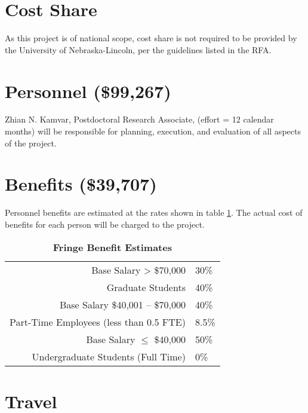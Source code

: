 \documentclass[12pt,letterpaper]{article}
\title{\ruleline{Budget Justification}}
\begin{document}
\maketitle

\section{Cost Share}

As this project is of national scope, cost share is not required to be provided by the University of Nebraska-Lincoln, per the guidelines listed in the RFA.

\section{Personnel (\$99,267)}
Zhian N. Kamvar, Postdoctoral Research Associate, (effort = 12 calendar months) will be responsible for planning, execution, and evaluation of all aspects of the project.

\section{Benefits (\$39,707)}

Personnel benefits are estimated at the rates shown in table \ref{fbe}. 
The actual cost of benefits for each person will be charged to the project. 

\begin{table}[h!]
\centering
\begin{tabular}{rl}
\hline
Base Salary > \$70,000 & 30\% \\
Graduate Students & 40\% \\
Base Salary \$40,001 -- \$70,000 & 40\% \\
Part-Time Employees (less than 0.5 FTE) & 8.5\% \\
Base Salary $\leq$ \$40,000 & 50\% \\
Undergraduate Students (Full Time) & 0\%\\\hline
\end{tabular}
\caption{\label{fbe}\textbf{Fringe Benefit Estimates}}
\end{table}



\section{Travel}
\end{document}
